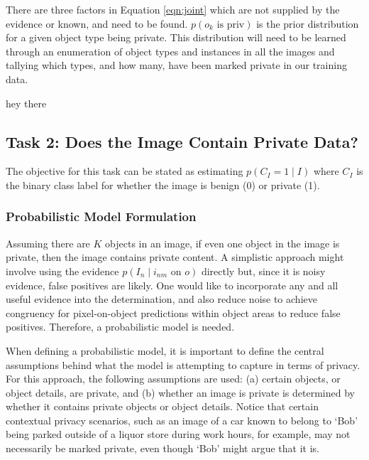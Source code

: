 \documentclass[11pt]{article}
\begin{document}
There are three factors in Equation \ref{eqn:joint} which are not supplied by the evidence or known, and need to be found.  $p(o_k \textrm{ is priv})$ is the prior distribution for a given object type being private.  This distribution will need to be learned through an enumeration of object types and instances in all the images and tallying which types, and how many, have been marked private in our training data.

\begin{algorithm}
\caption{hey there}
\end{algorithm}


\subsection{Task 2: Does the Image Contain Private Data?}

The objective for this task can be stated as estimating $p(C_I = 1 \mid I)$ where $C_I$ is the binary class label for whether the image is benign (0) or private (1).  


\subsubsection{Probabilistic Model Formulation}

Assuming there are $K$ objects in an image, if even one object in the image is private, then the image contains private content.  A simplistic approach might involve using the evidence $p(I_n \mid i_{nm} \textrm{ on } o)$ directly but, since it is noisy evidence, false positives are likely.  One would like to incorporate any and all useful evidence into the determination, and also reduce noise to achieve congruency for pixel-on-object predictions within object areas to reduce false positives. Therefore, a probabilistic model is needed.

When defining a probabilistic model, it is important to define the central assumptions behind what the model is attempting to capture in terms of privacy. For this approach, the following assumptions are used: (a) certain objects, or object details, are private, and (b) whether an image is private is determined by whether it contains private objects or object details.  Notice that certain contextual privacy scenarios, such as an image of a car known to belong to `Bob' being parked outside of a liquor store during work hours, for example, may not necessarily be marked private, even though `Bob' might argue that it is.
\end{document}
